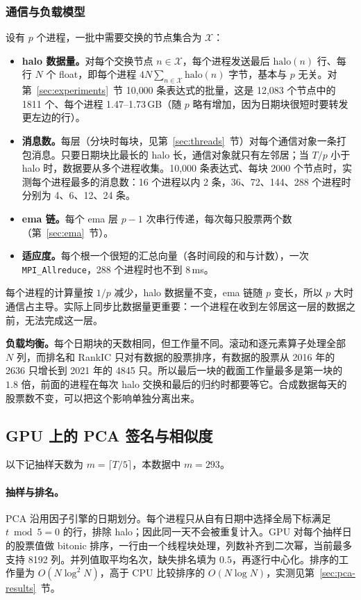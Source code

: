 \documentclass[11pt,a4paper,UTF8,fontset=fandol]{ctexart}
\newcommand{\code}[1]{\texttt{#1}}
\begin{document}
\subsubsection{通信与负载模型}
设有 $p$ 个进程，一批中需要交换的节点集合为 $\mathcal{X}$：
\begin{itemize}[nosep]
  \item \textbf{halo 数据量。}对每个交换节点 $n\in\mathcal{X}$，每个进程发送最后 $\mathrm{halo}(n)$ 行、每行 $N$ 个 float，即每个进程 $4N\sum_{n\in\mathcal{X}}\mathrm{halo}(n)$ 字节，基本与 $p$ 无关。对第~\ref{sec:experiments}~节 10{,}000 条表达式的批量，这是 12{,}083 个节点中的 1811 个、每个进程 1.47--1.73\,GB（随 $p$ 略有增加，因为日期块很短时要转发更左边的行）。
  \item \textbf{消息数。}每层（分块时每块，见第~\ref{sec:threads}~节）对每个通信对象一条打包消息。只要日期块比最长的 halo 长，通信对象就只有左邻居；当 $T/p$ 小于 halo 时，数据要从多个进程收集。10{,}000 条表达式、每块 2000 个节点时，实测每个进程最多的消息数：16 个进程以内 2 条，36、72、144、288 个进程时分别为 4、6、12、24 条。
  \item \textbf{ema 链。}每个 ema 层 $p-1$ 次串行传递，每次每只股票两个数（第~\ref{sec:ema}~节）。
  \item \textbf{适应度。}每个根一个很短的汇总向量（各时间段的和与计数），一次 \code{MPI\_Allreduce}，288 个进程时也不到 8\,ms。
\end{itemize}
每个进程的计算量按 $1/p$ 减少，halo 数据量不变，ema 链随 $p$ 变长，所以 $p$ 大时通信占主导。实际上同步比数据量更重要：一个进程在收到左邻居这一层的数据之前，无法完成这一层。

\textbf{负载均衡。}每个日期块的天数相同，但工作量不同。滚动和逐元素算子处理全部 $N$ 列，而排名和 RankIC 只对有数据的股票排序，有数据的股票从 2016 年的 2636 只增长到 2021 年的 4845 只。所以最后一块的截面工作量最多是第一块的 $1.8$ 倍，前面的进程在每次 halo 交换和最后的归约时都要等它。合成数据每天的股票数不变，可以把这个影响单独分离出来。

\subsection{GPU 上的 PCA 签名与相似度}
\label{sec:pca}
\providecommand{\PCAFigureDir}{figures/pca}
以下记抽样天数为 $m=\lceil T/5\rceil$，本数据中 $m=293$。
\paragraph{抽样与排名。}
PCA 沿用因子引擎的日期划分。每个进程只从自有日期中选择全局下标满足 $t\bmod 5=0$ 的行，排除 halo；因此同一天不会被重复计入。GPU 对每个抽样日的股票值做 bitonic 排序，一行由一个线程块处理，列数补齐到二次幂，当前最多支持 8192 列。并列值取平均名次，缺失排名填为 $0.5$，再逐行中心化。排序的工作量为 $O(N\log^2N)$，高于 CPU 比较排序的 $O(N\log N)$，实测见第~\ref{sec:pca-results}~节。
\end{document}

